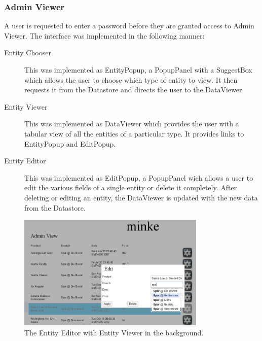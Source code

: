 \subsubsection{Admin Viewer}
A user is requested to enter a password before they are granted access to Admin
Viewer. The interface was implemented in the following manner:
\begin{description}
\item[Entity Chooser] This was implemented as EntityPopup, a PopupPanel with a
SuggestBox which allows the user to choose which type of entity to view. It
then requests it from the Datastore and directs the user to the DataViewer.
\item[Entity Viewer]This was implemented as DataViewer which provides the user
with a tabular view of all the entities of a particular type. It provides links
to EntityPopup and EditPopup.
\item[Entity Editor] This was implemented as EditPopup, a PopupPanel wich allows
a user to edit the various fields of a single entity or delete it completely.
After deleting or editing an entity, the DataViewer is updated with the new data
from the Datastore.
\end{description}
\begin{figure}[h!]
\centering
\includegraphics[width=0.8\textwidth]{gwt-admin.png}
\caption{The Entity Editor with Entity Viewer in the background.}
\end{figure}
